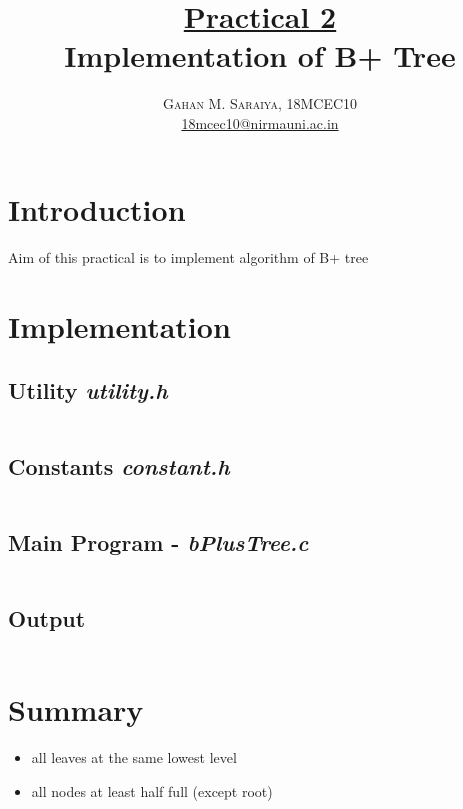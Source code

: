\documentclass[paper=letter, fontsize=12pt]{article}
\title{\vspace{-15mm}\fontsize{24pt}{10pt}\selectfont\textbf{
		\underline{Practical 2}\\Implementation of B+ Tree}} %
\author{\large{\textsc{
		Gahan M. Saraiya, 18MCEC10 }}\\[2mm]
\normalsize \href{mailto:18mcec10@nirmauni.ac.in}{18mcec10@nirmauni.ac.in}\\[2mm] %
}
\date{}
\begin{document}
\maketitle %
\thispagestyle{fancy} %

\newcommand*\tick{\item[\Checkmark]}
\newcommand*\arrow{\item[$\Rightarrow$]}
\newcommand*\fail{\item[\XSolidBrush]}

\section{Introduction}
\paragraph{}
Aim of this practical is to implement algorithm of B+ tree 

\section{Implementation}

\subsection{Utility \textbf{\textit{utility.h}}}
\inputminted[frame=lines, breaklines, linenos]{c}{../../utils/utility.h}

\subsection{Constants \textbf{\textit{constant.h}}}
\inputminted[frame=lines, breaklines, linenos]{c}{../../utils/constant.h}

\subsection{Main Program - \textbf{\textit{bPlusTree.c}}}
\inputminted[frame=lines, breaklines, linenos]{c}{../bPlusTree.c}

\subsection*{Output}
\inputminted[frame=lines, breaklines]{text}{../bplus.out}

\section{Summary}
\begin{itemize}
	\item all leaves at the same lowest level
	\item all nodes at least half full (except root)
\end{itemize}
\end{document}
